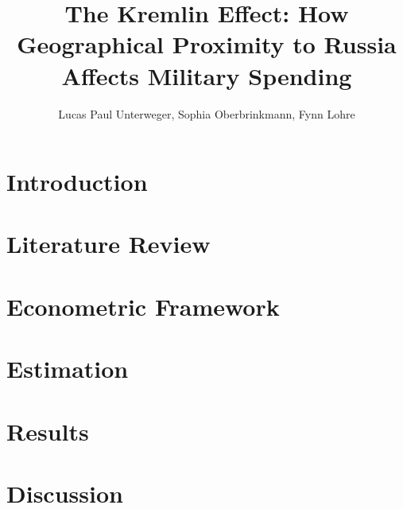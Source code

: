 \documentclass[12pt,a4paper]{article}
\author{Lucas Paul Unterweger, Sophia Oberbrinkmann, Fynn Lohre}
\title{The Kremlin Effect: How Geographical Proximity to Russia Affects Military Spending}
\begin{document}
\maketitle
\pagebreak

\tableofcontents
\pagebreak

\section{Introduction}
\section{Literature Review}
\section{Econometric Framework}
\section{Estimation}
\section{Results}
\section{Discussion}
\end{document}

